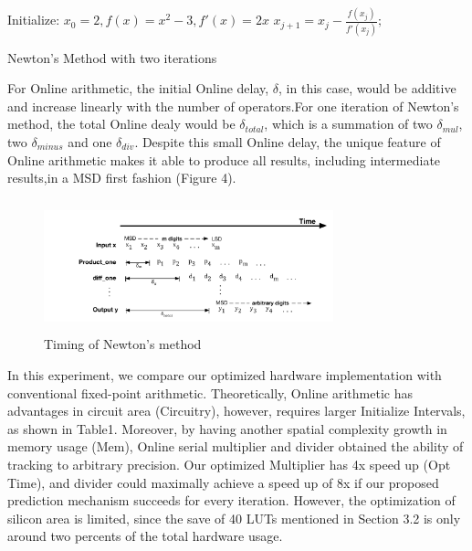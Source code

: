 \documentclass{sig-alternate}
\begin{document}
  	\begin{algorithm}
  		\begin{algorithmic}[1]
  			\State Initialize: $x_{0}=2, f(x)=x^{2}-3, f'(x)=2x$	
  			\State $x_{j+1}=x_{j}-\frac{f(x_j)}{f'(x_j)};$
  			\EndFor
  		\end{algorithmic}
  		\caption{Newton's Method with two iterations}
  		\label{alg:algorithm3}
  	\end{algorithm}
For Online arithmetic, the initial Online delay, $\delta$, in this case, would be additive and increase linearly with the number of operators.For one iteration of Newton's method, the total Online dealy would be $\delta_{total}$, which is a summation of two $\delta_{mul}$, two $\delta_{minus}$ and one $\delta_{div}$. 
Despite this small Online delay, the unique feature of Online arithmetic makes it able to produce all results, including intermediate results,in a MSD first fashion (Figure 4).
\vspace{-10pt}
\begin{figure} [ht]
	\centering
	\includegraphics[width=3.3in,height=1.5in]{newton_timing}
	\caption{Timing of Newton's method}
\end{figure}

In this experiment, we compare our optimized hardware implementation with conventional fixed-point arithmetic. 
Theoretically, Online arithmetic has advantages in circuit area (Circuitry), however, requires larger Initialize Intervals, as shown in Table1. Moreover, by having another spatial complexity growth in memory usage (Mem), Online serial multiplier and divider obtained the ability of tracking to arbitrary precision. Our optimized Multiplier has 4x speed up (Opt Time), and divider could maximally achieve a speed up of 8x if our proposed prediction mechanism succeeds for every iteration. However, the optimization of silicon area is limited, since the save of 40 LUTs mentioned in Section 3.2 is only around two percents of the total hardware usage.
\end{document}
